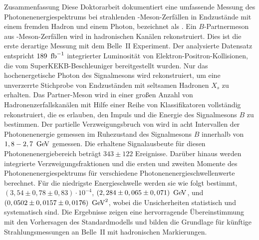     \begin{abstractpage}{Zusammenfassung}
        Diese Doktorarbeit dokumentiert eine umfassende Messung des Photonenenergiespektrums bei strahlenden \B-Meson-Zerfällen 
        in Endzustände mit einem fremden Hadron und einem Photon, bezeichnet als \BtoXsgamma. 
        Ein $B$-Partnermeson aus \FourS-Meson-Zerfällen wird in hadronischen Kanälen rekonstruiert.
        Dies ist die erste derartige Messung mit dem Belle~II Experiment.
        Der analysierte Datensatz entspricht $189~\mbox{\,fb}^{-1}$ integrierter Luminosität von Elektron-Positron-Kollisionen, die vom SuperKEKB-Beschleuniger bereitgestellt wurden.
        Nur das hochenergetische Photon des Signalmesons \B wird rekonstruiert, um eine unverzerrte Stichprobe von Endzuständen mit seltsamen Hadronen $X_s$ zu erhalten.
        Das Partner-Meson \B wird in einer gro{\ss}en Anzahl von Hadronenzerfallskanälen mit Hilfe einer Reihe von Klassifikatoren vollständig rekonstruiert,
        die es erlauben, den Impuls und die Energie des Signalmesons $B$ zu bestimmen.
        Der partielle Verzweigungsbruch von \BtoXsgamma wird in acht Intervallen der Photonenenergie gemessen 
        im Ruhezustand des Signalmesons $B$ innerhalb von $1,8-2,7~\mathrm{\,Ge\kern -0.1em V}$ gemessen.
        Die erhaltene Signalausbeute für diesen Photonenenergiebereich beträgt $343 \pm 122$ Ereignisse. 
        Darüber hinaus werden integrierte Verzweigungsfraktionen und die ersten und zweiten Momente des Photonenenergiespektrums für verschiedene Photonenenergieschwellenwerte berechnet.
        Für die niedrigste Energieschwelle werden sie wie folgt bestimmt, 
        $(3,54 \pm 0,78 \pm 0,83)\cdot10^{-4}$,
        $(2,284 \pm 0,065 \pm 0,071)~\mathrm{\,Ge\kern -0.1em V}$,
        und $(0,0502 \pm 0,0157 \pm 0,0176)~\mathrm{\,Ge\kern -0.1em V}^2$,
        wobei die Unsicherheiten statistisch und systematisch sind.
        Die Ergebnisse zeigen eine hervorragende Übereinstimmung mit den Vorhersagen des Standardmodells und bilden die Grundlage für künftige Strahlungsmessungen an Belle~II mit hadronischen Markierungen.
    \end{abstractpage}
    